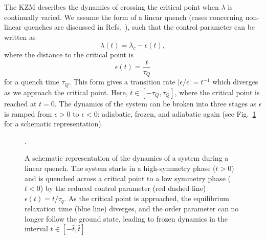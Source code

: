 The KZM describes the dynamics of crossing the critical point when $\lambda$ 
is continually varied.
We assume the form of a linear quench (cases concerning non-linear quenches are
discussed in Refs.~\cite{Barankov2008,Mondal2009}), such that the control
parameter can be written as
\begin{equation}
    \lambda(t) = \lambda_c - \epsilon(t),
\end{equation}
where the distance to the critical point is
\begin{equation}
    \epsilon(t) = \frac{t}{\tau_Q}
    \label{eq: time-dependent-epsilon}
\end{equation}
for a quench time $\tau_Q$.
This form gives a transition rate $|\dot{\epsilon}/{\epsilon}|=t^{-1}$ which
diverges as we approach the critical point.
Here, $t \in [-\tau_Q, \tau_Q]$, where the critical point is reached at $t=0$.
The dynamics of the system can be broken into three stages as $\epsilon$ is
ramped from $\epsilon > 0$ to $\epsilon < 0$: adiabatic, frozen, and adiabatic
again (see Fig.~\ref{fig: adiabatic-impulse} for a schematic representation).
\begin{figure}
    \centering
    \caption{A schematic representation of the dynamics of a system during a
    linear quench. The system starts in a high-symmetry phase ($t>0$) and is
    quenched across a critical point to a low symmetry phase ($t < 0$) by the
    reduced control parameter (red dashed line) $\epsilon(t)=t/\tau_q$. As
    the critical point is approached, the equilibrium relaxation time
    (blue line) diverges, and the order parameter can no longer follow the 
    ground state, leading to frozen dynamics in the interval
    $t \in [-\hat{t}, \hat{t}]$}.
    \label{fig: adiabatic-impulse}
\end{figure}
